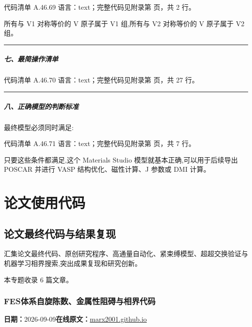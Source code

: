 \documentclass[lang=cn,scheme=chinese,color=blue,device=normal,toc=onecol,math=cm]{elegantbook}
\begin{document}
\begin{codeindexbox}{代码清单 A.46.69}
语言：text；完整代码见附录第 \pageref{code:46:69} 页，共 2 行。
\end{codeindexbox}


所有与 V1 对称等价的 V 原子属于 V1 组,所有与 V2 对称等价的 V 原子属于 V2 组。\par


\medskip\hrule\medskip


\subsubsection{七、最简操作清单}


\begin{codeindexbox}{代码清单 A.46.70}
语言：text；完整代码见附录第 \pageref{code:46:70} 页，共 27 行。
\end{codeindexbox}


\medskip\hrule\medskip


\subsubsection{八、正确模型的判断标准}


最终模型必须同时满足:\par


\begin{codeindexbox}{代码清单 A.46.71}
语言：text；完整代码见附录第 \pageref{code:46:71} 页，共 7 行。
\end{codeindexbox}


只要这些条件都满足,这个 Materials Studio 模型就基本正确,可以用于后续导出 POSCAR 并进行 VASP 结构优化、磁性计算、J 参数或 DMI 计算。\par


\part{论文使用代码}
\chapter{论文最终代码与结果复现}
\begin{partbox}汇集论文最终代码、原创研究程序、高通量自动化、紧束缚模型、超超交换验证与机器学习相界搜索,突出成果复现和研究创新。\par\medskip 本专题收录 6 篇文章。\end{partbox}

\section{FES体系自旋陈数、金属性阻碍与相界代码}
\begin{articlemeta}
\textbf{日期：}2026-09-09\hfill\textbf{在线原文：}\href{https://marx2001.github.io/sci-note\_posts/20260909-altermagnetic-fes-code/}{marx2001.github.io}
\end{articlemeta}
\end{document}
